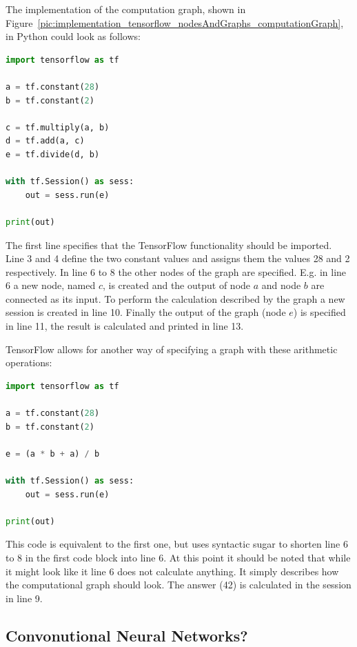 The implementation of the computation graph, shown in Figure~\ref{pic:implementation_tensorflow_nodesAndGraphs_computationGraph}, in Python could look as follows:

\begin{lstlisting}[language=python]
import tensorflow as tf

a = tf.constant(28)
b = tf.constant(2)

c = tf.multiply(a, b)
d = tf.add(a, c)
e = tf.divide(d, b)

with tf.Session() as sess:
    out = sess.run(e)

print(out)

\end{lstlisting}

The first line specifies that the TensorFlow functionality should be imported. Line 3 and 4 define the two constant values and assigns them the values 28 and 2 respectively. In line 6 to 8 the other nodes of the graph are specified. E.g. in line 6 a new node, named $c$, is created and the output of node $a$ and node $b$ are connected as its input. To perform the calculation described by the graph a new session is created in line 10. Finally the output of the graph (node $e$) is specified in line 11, the result is calculated and printed in line 13.

TensorFlow allows for another way of specifying a graph with these arithmetic operations:

\begin{lstlisting}[language=python]
import tensorflow as tf

a = tf.constant(28)
b = tf.constant(2)

e = (a * b + a) / b

with tf.Session() as sess:
	out = sess.run(e)

print(out)

\end{lstlisting}

This code is equivalent to the first one, but uses syntactic sugar to shorten line 6 to 8 in the first code block into line 6. At this point it should be noted that while it might look like it line 6 does not calculate anything. It simply describes how the computational graph should look. The answer (42) is calculated in the session in line 9.

\subsection{Convonutional Neural Networks?}

